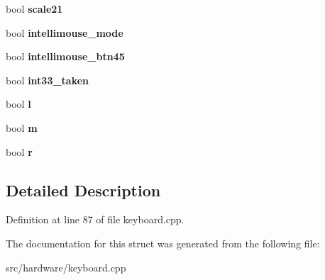 \begin{DoxyCompactItemize}
\item 
\hypertarget{structps2mouse_ab6d41806329d94ccd788853e8b6f36f3}{bool {\bfseries scale21}}\label{structps2mouse_ab6d41806329d94ccd788853e8b6f36f3}

\item 
\hypertarget{structps2mouse_afbc6ac0efb4991a79f66e5e5e2a89b19}{bool {\bfseries intellimouse\-\_\-mode}}\label{structps2mouse_afbc6ac0efb4991a79f66e5e5e2a89b19}

\item 
\hypertarget{structps2mouse_aa2d43c441bced55d4aa4bf18f42a3fb9}{bool {\bfseries intellimouse\-\_\-btn45}}\label{structps2mouse_aa2d43c441bced55d4aa4bf18f42a3fb9}

\item 
\hypertarget{structps2mouse_a24804c088c3b53b0e5425819a844cffc}{bool {\bfseries int33\-\_\-taken}}\label{structps2mouse_a24804c088c3b53b0e5425819a844cffc}

\item 
\hypertarget{structps2mouse_ad012940ddb2e6e826edc420d5cdc9871}{bool {\bfseries l}}\label{structps2mouse_ad012940ddb2e6e826edc420d5cdc9871}

\item 
\hypertarget{structps2mouse_ad94f7a068aab0cef083a02033d8c2671}{bool {\bfseries m}}\label{structps2mouse_ad94f7a068aab0cef083a02033d8c2671}

\item 
\hypertarget{structps2mouse_a38da8cabd941a1a374da3b35ef90ff35}{bool {\bfseries r}}\label{structps2mouse_a38da8cabd941a1a374da3b35ef90ff35}

\end{DoxyCompactItemize}


\subsection{Detailed Description}


Definition at line 87 of file keyboard.\-cpp.



The documentation for this struct was generated from the following file\-:\begin{DoxyCompactItemize}
\item 
src/hardware/keyboard.\-cpp\end{DoxyCompactItemize}
